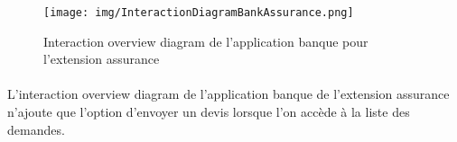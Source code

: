\documentclass[]{article}
\begin{document}
    \begin{figure}[ht]
        \centering
        \texttt{[image: img/InteractionDiagramBankAssurance.png]}
        \caption{Interaction overview diagram de l'application banque pour l'extension assurance}
        \label{fig1}
        \end{figure}

    \paragraph{}L’interaction overview diagram de l’application banque de l’extension assurance n’ajoute que l’option d’envoyer un devis lorsque l’on accède à la liste des demandes.
\end{document}
